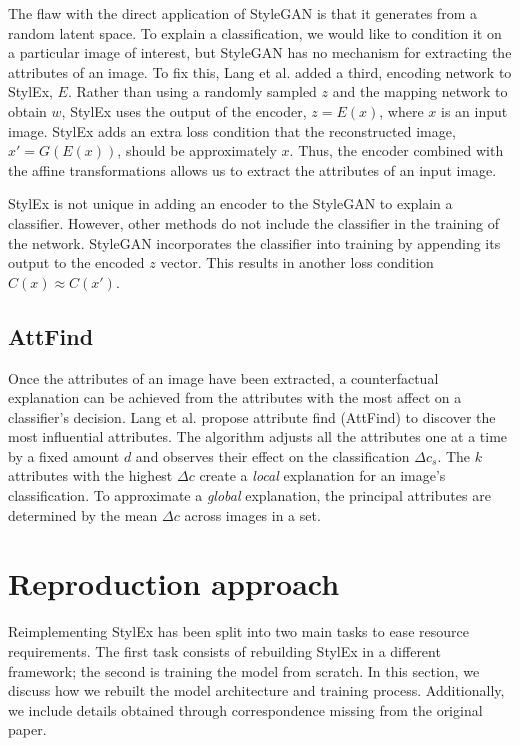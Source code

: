 The flaw with the direct application of StyleGAN is that it generates from a random latent space. To explain a classification, we would like to condition it on a particular image of interest, but StyleGAN has no mechanism for extracting the attributes of an image. To fix this, Lang et al. added a third, encoding network to StylEx, $E$. Rather than using a randomly sampled $z$ and the mapping network to obtain $w$, StylEx uses the output of the encoder, $z = E(x)$, where $x$ is an input image. StylEx adds an extra loss condition that the reconstructed image, $x' = G(E(x))$, should be approximately $x$. Thus, the encoder combined with the affine transformations allows us to extract the attributes of an input image.

StylEx is not unique in adding an encoder to the StyleGAN to explain a classifier. However, other methods do not include the classifier in the training of the network. StyleGAN incorporates the classifier into training by appending its output to the encoded $z$ vector. This results in another loss condition $C(x) \approx C(x')$.

\subsection{AttFind}

Once the attributes of an image have been extracted, a counterfactual explanation can be achieved from the attributes with the most affect on a classifier's decision. Lang et al. propose attribute find (AttFind) to discover the most influential attributes. The algorithm adjusts all the attributes one at a time by a fixed amount $d$ and observes their effect on the classification $\Delta c_s$. The $k$ attributes with the highest $\Delta c$ create a \textit{local} explanation for an image's classification. To approximate a \textit{global} explanation, the principal attributes are determined by the mean $\Delta c$ across images in a set. 

\section{Reproduction approach}

Reimplementing StylEx has been split into two main tasks to ease resource requirements. The first task consists of rebuilding StylEx in a different framework; the second is training the model from scratch. In this section, we discuss how we rebuilt the model architecture and training process. Additionally, we include details obtained through correspondence missing from the original paper.

